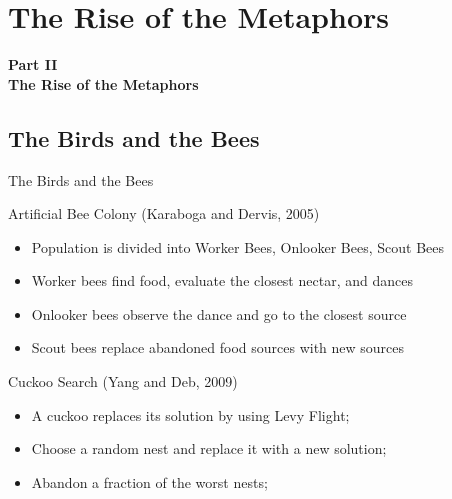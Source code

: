 \documentclass[aspectratio=169]{beamer}
\begin{document}
\section{The Rise of the Metaphors}
\begin{frame}
  \begin{center}
  {\large{\bf
  Part II\\
  The Rise of the Metaphors
  }}
  \end{center}
\end{frame}

\subsection{The Birds and the Bees}
\begin{frame}{The Birds and the Bees}
  \begin{block}{Artificial Bee Colony (Karaboga and Dervis, 2005)}
    \begin{itemize}
      \item Population is divided into Worker Bees, Onlooker Bees, Scout Bees
      \item Worker bees find food, evaluate the closest nectar, and \alert{dances}
      \item Onlooker bees observe the dance and go to the closest source
      \item Scout bees replace abandoned food sources with new sources
    \end{itemize}
  \end{block}
  \begin{block}{Cuckoo Search (Yang and Deb, 2009)}
    \begin{itemize}
      \item A cuckoo replaces its solution by using Levy Flight;
      \item Choose a random nest and replace it with a new solution;
      \item Abandon a fraction of the \alert{worst nests};
    \end{itemize}
  \end{block}
\end{frame}
\end{document}

